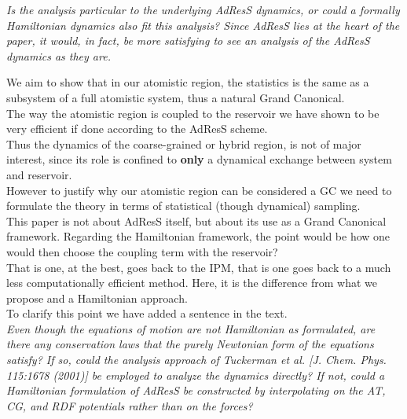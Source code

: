 \documentclass[12pt,a4paper]{article}
\begin{document}
{\color{teal} {\it Is the analysis particular to the underlying AdResS
dynamics, or could a formally Hamiltonian dynamics also fit this analysis? Since AdResS lies at the heart
of the paper, it would, in fact, be more satisfying to see an analysis of the AdResS dynamics as they are.}}

We aim to show that in our atomistic region, the statistics is the same as a subsystem of a full atomistic system, thus a natural Grand Canonical.\\
The way the atomistic region is coupled to the reservoir we have shown to be very efficient if done according to the AdResS scheme.\\
Thus the dynamics of the coarse-grained or hybrid region, is not of major interest, since its role is confined to {\bf only} a dynamical exchange between system and reservoir.\\
However to justify why our atomistic region can be considered a GC we need to formulate the theory in terms of statistical (though dynamical) sampling.\\
This paper is not about AdResS itself, but about its use as a Grand Canonical framework. Regarding the Hamiltonian framework, the point would be how one would then choose the coupling term with the reservoir?\\
That is one, at the best, goes back to the {IPM}, that is one goes back to a much less computationally efficient method. Here, it is the difference from what we propose and a Hamiltonian approach.\\
To clarify this point we have added a sentence in the text.\\

{\color{teal} {\it Even though the equations of motion are not Hamiltonian as formulated, are there any conservation laws
that the purely Newtonian form of the equations satisfy? If so, could the analysis approach of Tuckerman
et al. [J. Chem. Phys. 115:1678 (2001)] be employed to analyze the dynamics directly? If not, could a
Hamiltonian formulation of AdResS be constructed by interpolating on the AT, CG, and RDF potentials
rather than on the forces?}}\\
\end{document}
